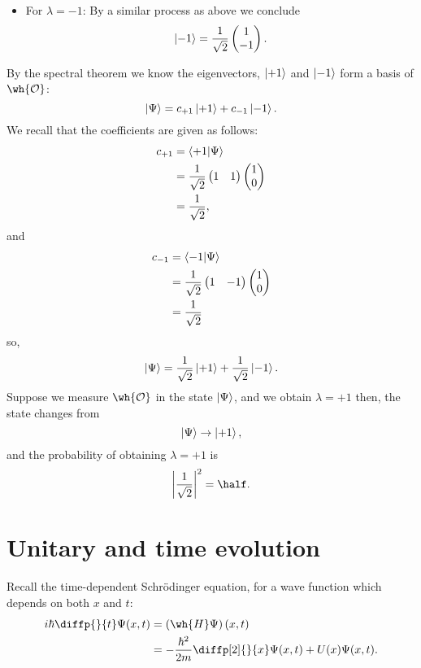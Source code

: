 \documentclass[12pt, a4paper]{article}
\begin{document}
\begin{example}
\begin{itemize}
\begin{itemize}
            \item For \(\lambda = -1\):
            By a similar process as above we conclude 
            \[\ket{-1} = \frac{1}{\sqrt{2}} \begin{pmatrix} 1\\-1 \end{pmatrix}.\]
        \end{itemize}
    \end{itemize}
    By the spectral theorem we know the eigenvectors, \(\ket{+1}\) and \(\ket{-1}\) form a basis of \(\wh{\mathcal{O}}\):
    \[\ket{\Psi} = c_{+1} \ket{+1}+ c_{-1} \ket{-1}.\]
    We recall that the coefficients are given as follows:
    \[\begin{aligned}
        c_{+1} &= \bra{+1}\ket{\Psi} \\
        &= \frac{1}{\sqrt{2}} \begin{pmatrix} 1 & 1\end{pmatrix} \begin{pmatrix} 1 \\ 0 \end{pmatrix} \\
        &= \frac{1}{\sqrt{2}},
    \end{aligned}\]
    and
    \[\begin{aligned}
        c_{-1} &= \bra{-1}\ket{\Psi} \\
        &= \frac{1}{\sqrt{2}} \begin{pmatrix} 1 & -1\end{pmatrix} \begin{pmatrix} 1 \\ 0 \end{pmatrix} \\
        &= \frac{1}{\sqrt{2}}
    \end{aligned}\]
    so,
    \[\ket{\Psi} = \frac{1}{\sqrt{2}} \ket{+1}+ \frac{1}{\sqrt{2}} \ket{-1}.\]
    Suppose we measure \(\wh{\mathcal{O}}\) in the state \(\ket{\Psi}\), and we obtain \(\lambda=+1\) then, the state changes from 
    \[\ket{\Psi} \to \ket{+1},\]
    and the probability of obtaining \(\lambda=+1\) is 
    \[\abs{\frac{1}{\sqrt{2}}}^2 = \half.\]
\end{example}

\section{Unitary and time evolution}

Recall the time-dependent Schrödinger equation, for a wave function which depends on both \(x\) and \(t\):
\[\begin{aligned}
    i\hbar \diffp{}{t}\Psi(x,t) &= \left( \wh{H}\Psi \right)(x,t) \\
    &= -\frac{\hbar^2}{2m} \diffp[2]{}{x}\Psi(x,t) +U(x) \Psi(x,t).
\end{aligned}\]
\end{document}
